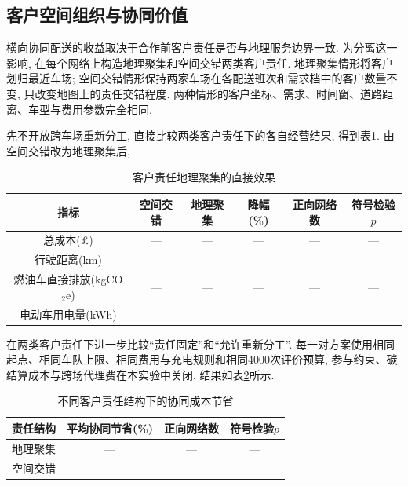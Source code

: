 \documentclass{setp-new}
\newcommand{\setptabsetup}{\fontsize{9pt}{10.5pt}\selectfont\renewcommand{\arraystretch}{0.90}\setlength{\tabcolsep}{2.2pt}\setlength{\aboverulesep}{0.4pt}\setlength{\belowrulesep}{0.4pt}\hbadness=10000}
\begin{document}
\subsection{客户空间组织与协同价值}

横向协同配送的收益取决于合作前客户责任是否与地理服务边界一致\cite{ref:49}.
为分离这一影响, 在每个网络上构造地理聚集和空间交错两类客户责任.
地理聚集情形将客户划归最近车场;
空间交错情形保持两家车场在各配送班次和需求档中的客户数量不变, 只改变地图上的责任交错程度.
两种情形的客户坐标、需求、时间窗、道路距离、车型与费用参数完全相同.

先不开放跨车场重新分工, 直接比较两类客户责任下的各自经营结果,
得到表\ref{tab:geographic-effect}.
由空间交错改为地理聚集后,

\begin{table}[H]
\centering
\caption{客户责任地理聚集的直接效果}
\label{tab:geographic-effect}
\setptabsetup
\begin{tabular}{@{}cccccc@{}}
\toprule
指标 & 空间交错 & 地理聚集 & 降幅(\%) & 正向网络数 & 符号检验$p$\\
\midrule
总成本(£)        & --- & --- & --- & --- & ---\\
行驶距离(km)      & --- & --- & --- & --- & ---\\
燃油车直接排放(kgCO$_2$e) & --- & --- & --- & --- & ---\\
电动车用电量(kWh) & --- & --- & --- & --- & ---\\
\bottomrule
\end{tabular}
\end{table}

在两类客户责任下进一步比较``责任固定''和``允许重新分工''.
每一对方案使用相同起点、相同车队上限、相同费用与充电规则和相同4000次评价预算,
参与约束、碳结算成本与跨场代理费在本实验中关闭.
结果如表\ref{tab:collaborative-savings}所示.

\begin{table}[H]
\centering
\caption{不同客户责任结构下的协同成本节省}
\label{tab:collaborative-savings}
\setptabsetup
\begin{tabular}{@{}cccc@{}}
\toprule
责任结构 & 平均协同节省(\%) & 正向网络数 & 符号检验$p$\\
\midrule
地理聚集 & --- & --- & ---\\
空间交错 & --- & --- & ---\\
\bottomrule
\end{tabular}
\end{table}
\end{document}
